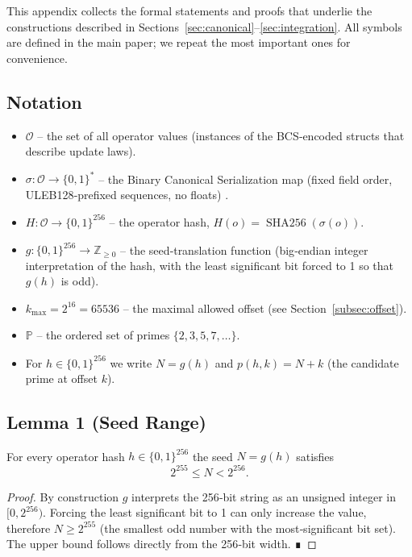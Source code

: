 \documentclass[11pt]{article}
\begin{document}
This appendix collects the formal statements and proofs that underlie the constructions
described in Sections~\ref{sec:canonical}--\ref{sec:integration}.  
All symbols are defined in the main paper; we repeat the most important ones for
convenience.

\subsection{Notation}
\begin{itemize}
  \item $\mathcal{O}$ – the set of all operator values (instances of the BCS‑encoded
        structs that describe update laws).
  \item $\sigma:\mathcal{O}\rightarrow\{0,1\}^{*}$ – the Binary Canonical Serialization
        map (fixed field order, ULEB128‑prefixed sequences, no floats) \cite{web:46}.
  \item $H:\mathcal{O}\rightarrow\{0,1\}^{256}$ – the operator hash,
        $H(o)=\operatorname{SHA256}(\sigma(o))$.
  \item $g:\{0,1\}^{256}\rightarrow\mathbb{Z}_{\ge0}$ – the seed‑translation function
        (big‑endian integer interpretation of the hash, with the least significant bit
        forced to 1 so that $g(h)$ is odd).
  \item $k_{\max}=2^{16}=65536$ – the maximal allowed offset (see
        Section~\ref{subsec:offset}).
  \item $\mathbb{P}$ – the ordered set of primes $\{2,3,5,7,\dots\}$.
  \item For $h\in\{0,1\}^{256}$ we write $N=g(h)$ and
        $p(h,k)=N+k$ (the candidate prime at offset $k$).
\end{itemize}

\subsection{Lemma 1 (Seed Range)}
For every operator hash $h\in\{0,1\}^{256}$ the seed $N=g(h)$ satisfies
\[
2^{255}\le N<2^{256}.
\]
\begin{proof}
  By construction $g$ interprets the 256‑bit string as an unsigned integer in
  $[0,2^{256})$.  Forcing the least significant bit to 1 can only increase the value,
  therefore $N\ge 2^{255}$ (the smallest odd number with the most‑significant bit set).
  The upper bound follows directly from the 256‑bit width.  ∎
\end{proof}
\end{document}
